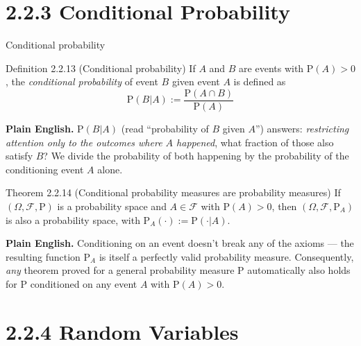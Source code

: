 \documentclass[aspectratio=169,10pt]{beamer}
\begin{document}
\section{2.2.3 Conditional Probability}

\begin{frame}{Conditional probability}
\begin{block}{Definition 2.2.13 (Conditional probability)}
If $A$ and $B$ are events with $\mathrm{P}(A)>0$, the \emph{conditional
probability} of event $B$ given event $A$ is defined as
\[ \mathrm{P}(B|A) := \frac{\mathrm{P}(A\cap B)}{\mathrm{P}(A)} \]
\end{block}
\textbf{Plain English.} $\mathrm{P}(B|A)$ (read ``probability of $B$ given
$A$'') answers: \emph{restricting attention only to the outcomes where $A$
happened}, what fraction of those also satisfy $B$? We divide the
probability of both happening by the probability of the conditioning event
$A$ alone.

\begin{block}{Theorem 2.2.14 (Conditional probability measures are probability measures)}
If $(\Omega,\mathcal{F},\mathrm{P})$ is a probability space and $A\in\mathcal{F}$
with $\mathrm{P}(A)>0$, then $(\Omega,\mathcal{F},\mathrm{P}_A)$ is also a
probability space, with $\mathrm{P}_A(\cdot):=\mathrm{P}(\cdot|A)$.
\end{block}
\textbf{Plain English.} Conditioning on an event doesn't break any of the
axioms --- the resulting function $\mathrm{P}_A$ is itself a perfectly valid
probability measure. Consequently, \emph{any} theorem proved for a general
probability measure $\mathrm{P}$ automatically also holds for $\mathrm{P}$
conditioned on any event $A$ with $\mathrm{P}(A)>0$.
\end{frame}

\section{2.2.4 Random Variables}
\end{document}
